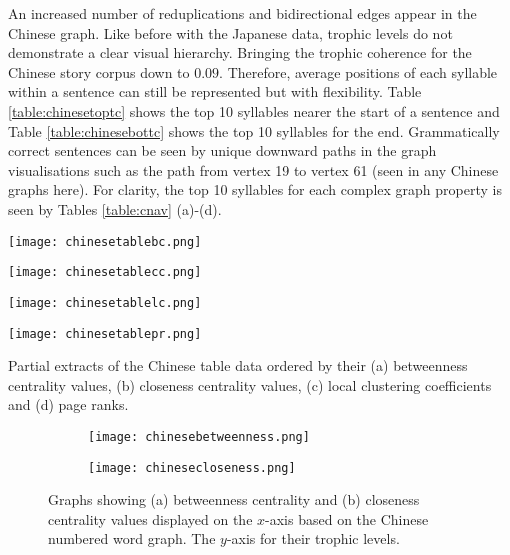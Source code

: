 An increased number of reduplications and bidirectional edges appear in the Chinese graph. Like before with the Japanese data, trophic levels do not demonstrate a clear visual hierarchy. Bringing the trophic coherence for the Chinese story corpus down to $0.09$. Therefore, average positions of each syllable within a sentence can still be represented but with flexibility. Table \ref{table:chinesetoptc} shows the top 10 syllables nearer the start of a sentence and Table \ref{table:chinesebottc} shows the top 10 syllables for the end. Grammatically correct sentences can be seen by unique downward paths in the graph visualisations such as the path from vertex 19 to vertex 61 (seen in any Chinese graphs here). For clarity, the top 10 syllables for each complex graph property is seen by Tables \ref{table:cnav} (a)-(d).

\begin{table}[!htb]
\centering
\begin{subtable}{.2\textwidth}
	\centering
	\texttt{[image: chinesetablebc.png]}
	\caption{}
	\label{table:chinesetablebc}
\end{subtable}
\hfill
\begin{subtable}{.2\textwidth}
	\centering
	\texttt{[image: chinesetablecc.png]}
	\caption{}
	\label{table:chinesetablecc}
\end{subtable}
\hfill
\begin{subtable}{.2\textwidth}
	\centering
	\texttt{[image: chinesetablelc.png]}
	\caption{}
	\label{table:chinesetablelc}
\end{subtable}
\hfill
\begin{subtable}{.2\textwidth}
	\centering
	\texttt{[image: chinesetablepr.png]}
	\caption{}
	\label{table:chinesetablepr}
\end{subtable}
\caption{Partial extracts of the Chinese table data ordered by their (a) betweenness centrality values, (b) closeness centrality values, (c) local clustering coefficients and (d) page ranks.}
\label{table:cnav}
\end{table}

\begin{figure}[!htb]
\centering
\begin{subfigure}{.45\textwidth}
	\hspace{-1cm} 
	\texttt{[image: chinesebetweenness.png]}
	\caption{}
	\label{fig:cnbc}
\end{subfigure}
\hfill
\begin{subfigure}{.45\textwidth}
	\hspace{-1cm} 
	\texttt{[image: chinesecloseness.png]}
	\caption{ }
	\label{fig:cncc}
\end{subfigure}
\caption{Graphs showing (a) betweenness centrality and (b) closeness centrality values displayed on the $x$-axis based on the Chinese numbered word graph. The $y$-axis for their trophic levels.}
\label{fig:cncentrality}
\end{figure}

